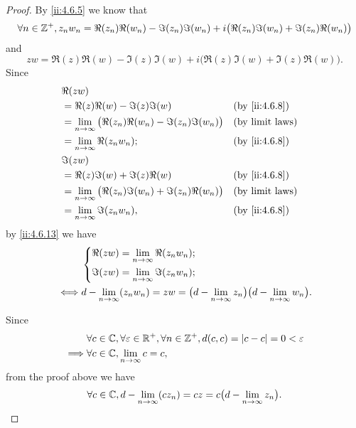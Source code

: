 \begin{proof}
  By \cref{ii:4.6.5} we know that
  \[
    \forall n \in \mathbb{Z}^+, z_n w_n = \Re(z_n) \Re(w_n) - \Im(z_n) \Im(w_n) + i \big(\Re(z_n) \Im(w_n) + \Im(z_n) \Re(w_n)\big)
  \]
  and
  \[
    z w = \Re(z) \Re(w) - \Im(z) \Im(w) + i \big(\Re(z) \Im(w) + \Im(z) \Re(w)\big).
  \]
  Since
  \begin{align*}
     & \Re(zw)                                                                                           \\
     & = \Re(z) \Re(w) - \Im(z) \Im(w)                                       &  & \by{ii:4.6.8}          \\
     & = \lim_{n \to \infty} \big(\Re(z_n) \Re(w_n) - \Im(z_n) \Im(w_n)\big) &  & \text{(by limit laws)} \\
     & = \lim_{n \to \infty} \Re(z_n w_n);                                   &  & \by{ii:4.6.8}          \\
     & \Im(zw)                                                                                           \\
     & = \Re(z) \Im(w) + \Im(z) \Re(w)                                       &  & \by{ii:4.6.8}          \\
     & = \lim_{n \to \infty} \big(\Re(z_n) \Im(w_n) + \Im(z_n) \Re(w_n)\big) &  & \text{(by limit laws)} \\
     & = \lim_{n \to \infty} \Im(z_n w_n),                                   &  & \by{ii:4.6.8}
  \end{align*}
  by \cref{ii:4.6.13} we have
  \begin{align*}
         & \begin{dcases}
             \Re(zw) = \lim_{n \to \infty} \Re(z_n w_n); \\
             \Im(zw) = \lim_{n \to \infty} \Im(z_n w_n);
           \end{dcases}                                                                           \\
    \iff & d - \lim_{n \to \infty} (z_n w_n) = zw = \big(d - \lim_{n \to \infty} z_n\big) \big(d - \lim_{n \to \infty} w_n\big).
  \end{align*}

  Since
  \begin{align*}
             & \forall c \in \mathbb{C}, \forall \varepsilon \in \mathbb{R}^+, \forall n \in \mathbb{Z}^+, d(c, c) = \left\lvert c - c\right\rvert = 0 < \varepsilon \\
    \implies & \forall c \in \mathbb{C}, \lim_{n \to \infty} c = c,
  \end{align*}
  from the proof above we have
  \[
    \forall c \in \mathbb{C}, d - \lim_{n \to \infty} (c z_n) = cz = c \big(d - \lim_{n \to \infty} z_n\big).
  \]


\end{proof}
